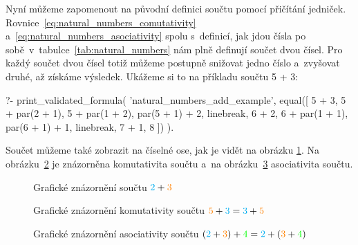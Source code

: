Nyní můžeme zapomenout na původní definici součtu pomocí přičítání jedniček. Rovnice~\eqref{eq:natural_numbers_comutativity} a~\eqref{eq:natural_numbers_asociativity} spolu s~definicí, jak jdou čísla po sobě~v~tabulce~\ref{tab:natural_numbers} nám plně definují součet dvou čísel. Pro každý součet dvou čísel totiž můžeme postupně snižovat jedno číslo a~zvyšovat druhé, až získáme výsledek. Ukážeme si to na příkladu součtu 5 + 3:

\begin{prolog}
?-	print_validated_formula(
		'natural_numbers_add_example',
		equal([
			5 + 3,
			5 + par(2 + 1),
			5 + par(1 + 2),
			par(5 + 1) + 2,
			linebreak,
			6 + 2,
			6 + par(1 + 1),
			par(6 + 1) + 1,
			linebreak,
			7 + 1,
			8
		])
	).
\end{prolog}

Součet můžeme také zobrazit na číselné ose, jak je vidět na obrázku \ref{img:soucet_ciselna_osa}. Na obrázku~\ref{img:komutativita_souctu_ciselna_osa} je znázorněna komutativita součtu a~na obrázku~\ref{img:asociativita_souctu_ciselna_osa} asociativita součtu.

\begin{figure}[!h]
\centering
{}
\caption{Grafické znázornění součtu \(\textcolor{cyan}{2} + \textcolor{orange}{3}\)}
\label{img:soucet_ciselna_osa}
\end{figure}

\begin{figure}[!h]
\centering
{}
\caption{Grafické znázornění komutativity součtu \(\textcolor{orange}{5} + \textcolor{cyan}{3} = \textcolor{cyan}{3} + \textcolor{orange}{5}\)}
\label{img:komutativita_souctu_ciselna_osa}
\end{figure}

\begin{figure}[!h]
\centering
{}
\caption{Grafické znázornění asociativity součtu \((\textcolor{cyan}{2} + \textcolor{orange}{3}) + \textcolor{green}{4} = \textcolor{cyan}{2} + (\textcolor{orange}{3} + \textcolor{green}{4})\)}
\label{img:asociativita_souctu_ciselna_osa}
\end{figure}


